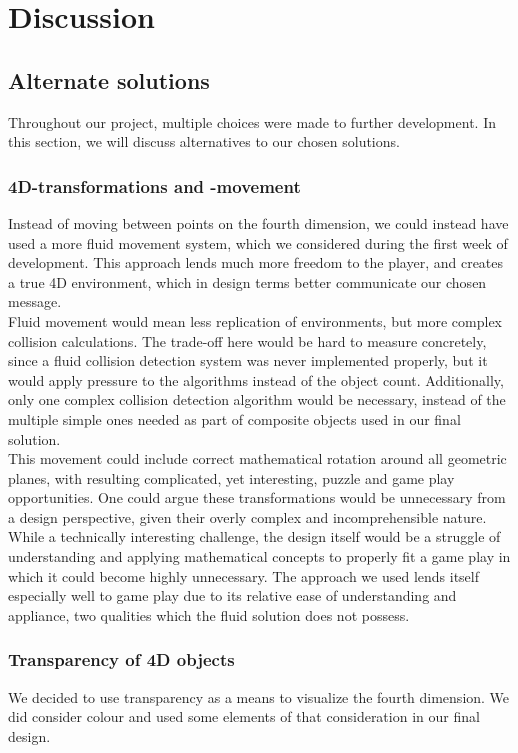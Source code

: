 \section{Discussion}
\subsection{Alternate solutions}
Throughout our project, multiple choices were made to further development. In this section, we will discuss alternatives to our chosen solutions.

\subsubsection{4D-transformations and -movement}
Instead of moving between points on the fourth dimension, we could instead have used a more fluid movement system, which we considered during the first week of development. This approach lends much more freedom to the player, and creates a true 4D environment, which in design terms better communicate our chosen message.\\

Fluid movement would mean less replication of environments, but more complex collision calculations. The trade-off here would be hard to measure concretely, since a fluid collision detection system was never implemented properly, but it would apply pressure to the algorithms instead of the object count. Additionally, only one complex collision detection algorithm would be necessary, instead of the multiple simple ones needed as part of composite objects used in our final solution.\\

This movement could include correct mathematical rotation around all geometric planes, with resulting complicated, yet interesting, puzzle and game play opportunities. One could argue these transformations would be unnecessary from a design perspective, given their overly complex and incomprehensible nature.\\

While a technically interesting challenge, the design itself would be a struggle of understanding and applying mathematical concepts to properly fit a game play in which it could become highly unnecessary. The approach we used lends itself especially well to game play due to its relative ease of understanding and appliance, two qualities which the fluid solution does not possess.

\subsubsection{Transparency of 4D objects}
We decided to use transparency as a means to visualize the fourth dimension. We did consider colour and used some elements of that consideration in our final design.\\

